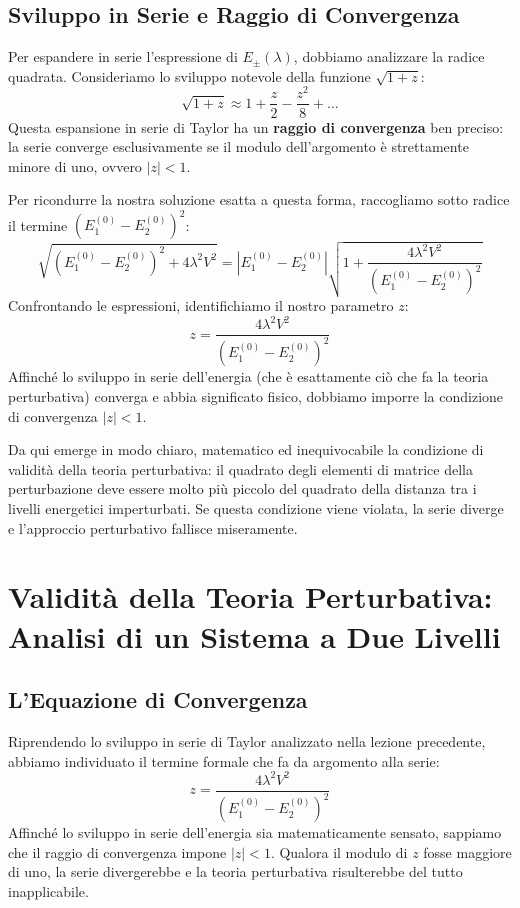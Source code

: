 \subsection{Sviluppo in Serie e Raggio di Convergenza}
Per espandere in serie l'espressione di $E_{\pm}(\lambda)$, dobbiamo analizzare la radice quadrata. Consideriamo lo sviluppo notevole della funzione $\sqrt{1+z}$:
\begin{equation}
\sqrt{1+z} \approx 1 + \frac{z}{2} - \frac{z^2}{8} + \dots
\end{equation}
Questa espansione in serie di Taylor ha un \textbf{raggio di convergenza} ben preciso: la serie converge esclusivamente se il modulo dell'argomento è strettamente minore di uno, ovvero $\vert{}z\vert{} < 1$.

Per ricondurre la nostra soluzione esatta a questa forma, raccogliamo sotto radice il termine $(E_1^{(0)} - E_2^{(0)})^2$:
\begin{equation}
\sqrt{(E_1^{(0)} - E_2^{(0)})^2 + 4\lambda^2 V^2} = |E_1^{(0)} - E_2^{(0)}| \sqrt{1 + \frac{4\lambda^2 V^2}{(E_1^{(0)} - E_2^{(0)})^2}}
\end{equation}
Confrontando le espressioni, identifichiamo il nostro parametro $z$:
\begin{equation}
z = \frac{4\lambda^2 V^2}{(E_1^{(0)} - E_2^{(0)})^2}
\end{equation}
Affinché lo sviluppo in serie dell'energia (che è esattamente ciò che fa la teoria perturbativa) converga e abbia significato fisico, dobbiamo imporre la condizione di convergenza $\vert{}z\vert{} < 1$.

Da qui emerge in modo chiaro, matematico ed inequivocabile la condizione di validità della teoria perturbativa: il quadrato degli elementi di matrice della perturbazione deve essere molto più piccolo del quadrato della distanza tra i livelli energetici imperturbati. Se questa condizione viene violata, la serie diverge e l'approccio perturbativo fallisce miseramente.

\section{Validità della Teoria Perturbativa: Analisi di un Sistema a Due Livelli}

\subsection{L'Equazione di Convergenza}
Riprendendo lo sviluppo in serie di Taylor analizzato nella lezione precedente, abbiamo individuato il termine formale che fa da argomento alla serie:
\begin{equation}
z = \frac{4\lambda^2 V^2}{(E_1^{(0)} - E_2^{(0)})^2}
\end{equation}
Affinché lo sviluppo in serie dell'energia sia matematicamente sensato, sappiamo che il raggio di convergenza impone $\vert{}z\vert{} < 1$. Qualora il modulo di $z$ fosse maggiore di uno, la serie divergerebbe e la teoria perturbativa risulterebbe del tutto inapplicabile.

